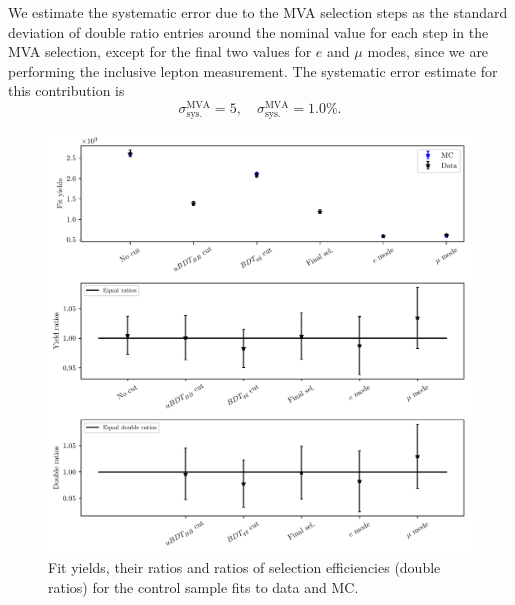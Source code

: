 We estimate the systematic error due to the MVA selection steps as the standard deviation of double ratio entries around the nominal value for each step in the MVA selection, except for the final two values for $e$ and $\mu$ modes, since we are performing the inclusive lepton measurement. The systematic error estimate for this contribution is 
\begin{equation}
\sigma_{\mathrm{sys.}}^{\mathrm{MVA}} = 5,\quad\sigma_{\mathrm{sys.}}^{\mathrm{MVA}} = 1.0\%.
\end{equation}

\begin{figure}[H]
	\centering
	\captionsetup{width=0.8\linewidth}
	\includegraphics[width=\linewidth]{fig/cs_fits.pdf}
	\caption{Fit yields, their ratios and ratios of selection efficiencies (double ratios) for the control sample fits to data and MC.}
	\label{fig:cs_fits}
\end{figure}

